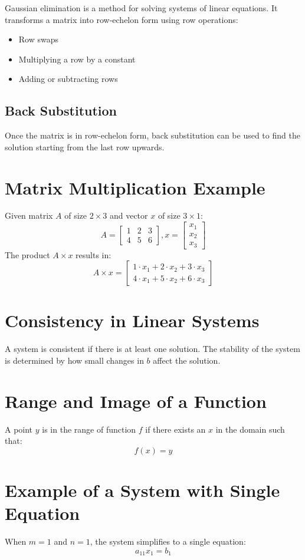 \documentclass{article}
\begin{document}
Gaussian elimination is a method for solving systems of linear equations. It transforms a matrix into row-echelon form using row operations:
\begin{itemize}
    \item Row swaps
    \item Multiplying a row by a constant
    \item Adding or subtracting rows
\end{itemize}

\subsection{Back Substitution}
Once the matrix is in row-echelon form, back substitution can be used to find the solution starting from the last row upwards.

\section{Matrix Multiplication Example}

Given matrix $A$ of size $2 \times 3$ and vector $x$ of size $3 \times 1$:
\[
A = \begin{bmatrix} 1 & 2 & 3 \\ 4 & 5 & 6 \end{bmatrix}
,
x = \begin{bmatrix} x_1 \\ x_2 \\ x_3 \end{bmatrix}
\]
The product $A \times x$ results in:
\[
A \times x = \begin{bmatrix} 1 \cdot x_1 + 2 \cdot x_2 + 3 \cdot x_3 \\ 4 \cdot x_1 + 5 \cdot x_2 + 6 \cdot x_3 \end{bmatrix}
\]

\section{Consistency in Linear Systems}

A system is consistent if there is at least one solution. The stability of the system is determined by how small changes in $b$ affect the solution.

\section{Range and Image of a Function}

A point $y$ is in the range of function $f$ if there exists an $x$ in the domain such that:
\[
f(x) = y
\]

\section{Example of a System with Single Equation}

When $m = 1$ and $n = 1$, the system simplifies to a single equation:
\[
a_{11} x_1 = b_1
\]
\end{document}
